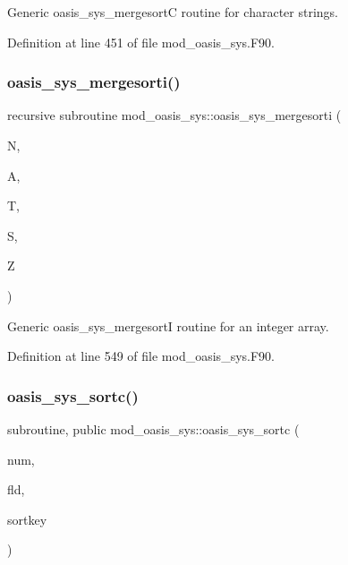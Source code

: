 Generic oasis\+\_\+sys\+\_\+mergesortC routine for character strings. 



Definition at line 451 of file mod\+\_\+oasis\+\_\+sys.\+F90.

\mbox{\label{namespacemod__oasis__sys_a298b27e03ff339d56eda3c5b31115781}} 
\subsubsection{\texorpdfstring{oasis\+\_\+sys\+\_\+mergesorti()}{oasis\_sys\_mergesorti()}}
{\footnotesize\ttfamily recursive subroutine mod\+\_\+oasis\+\_\+sys\+::oasis\+\_\+sys\+\_\+mergesorti (\begin{DoxyParamCaption}\item[{integer, intent(in)}]{N,  }\item[{integer(in), dimension(n), intent(inout)}]{A,  }\item[{integer(in), dimension((n+1)/2), intent(out)}]{T,  }\item[{integer(in), dimension(n), intent(inout)}]{S,  }\item[{integer(in), dimension((n+1)/2), intent(out)}]{Z }\end{DoxyParamCaption})\hspace{0.3cm}{\ttfamily [private]}}



Generic oasis\+\_\+sys\+\_\+mergesortI routine for an integer array. 



Definition at line 549 of file mod\+\_\+oasis\+\_\+sys.\+F90.

\mbox{\label{namespacemod__oasis__sys_ab2aa592727d1e5bea728281679d5ca8d}} 
\subsubsection{\texorpdfstring{oasis\+\_\+sys\+\_\+sortc()}{oasis\_sys\_sortc()}}
{\footnotesize\ttfamily subroutine, public mod\+\_\+oasis\+\_\+sys\+::oasis\+\_\+sys\+\_\+sortc (\begin{DoxyParamCaption}\item[{integer(in), intent(in)}]{num,  }\item[{character(len=cl), dimension(\+:), intent(inout)}]{fld,  }\item[{integer(in), dimension(\+:), intent(inout)}]{sortkey }\end{DoxyParamCaption})}



